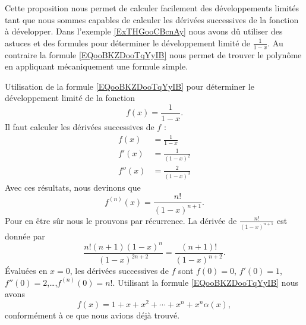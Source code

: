 Cette proposition nous permet de calculer facilement des développements limités tant que nous sommes capables de calculer les dérivées successives de la fonction à développer. Dans l'exemple \ref{ExTHGooCBcnAy} nous avons dû utiliser des astuces et des formules pour déterminer le développement limité de \( \frac{1}{ 1-x }\). Au contraire la formule \eqref{EQooBKZDooTqYyIB} nous permet de trouver le polynôme en appliquant mécaniquement une formule simple.

\begin{example}
    Utilisation de la formule \eqref{EQooBKZDooTqYyIB} pour déterminer le développement limité de la fonction
    \begin{equation}
        f(x)=\frac{1}{ 1-x }.
    \end{equation}
    Il faut calculer les dérivées successives de \( f\) :
    \begin{subequations}
        \begin{align}
            f(x)&=\frac{1}{ 1-x }\\
            f'(x)&=\frac{ 1 }{ (1-x)^2 }\\
            f''(x)&=\frac{ 2 }{ (1-x)^3 }
        \end{align}
    \end{subequations}
    Avec ces résultats, nous devinons que
    \begin{equation}
        f^{(n)}(x)=\frac{ n! }{ (1-x)^{n+1} }.
    \end{equation}
    Pour en être sûr nous le prouvons par récurrence. La dérivée de \(\frac{ n! }{ (1-x)^{n+1} } \) est donnée par
    \begin{equation}
        \frac{ n!(n+1)(1-x)^n }{ (1-x)^{2n+2} }=\frac{(n+1)! }{ (1-x)^{n+2} }.
    \end{equation}
    Évaluées en \( x=0\), les dérivées successives de \( f\) sont \( f(0)=0\), \( f'(0)=1\), \( f''(0)=2\),\ldots,\( f^{(n)}(0)=n!\). Utilisant la formule \eqref{EQooBKZDooTqYyIB} nous avons
    \begin{equation}
        f(x)=1+x+x^2+\cdots +x^n+x^n\alpha(x),
    \end{equation}
    conformément à ce que nous avions déjà trouvé.
\end{example}


